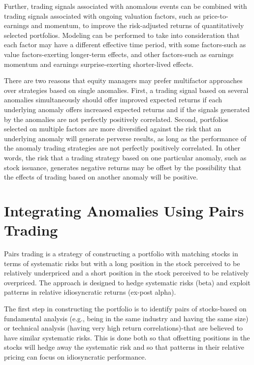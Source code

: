 \documentclass[11pt]{article}
\begin{document}
Further, trading signals associated with anomalous events can be combined with trading signals associated with ongoing valuation factors, such as price-to-earnings and momentum, to improve the risk-adjusted returns of quantitatively selected portfolios. Modeling can be performed to take into consideration that each factor may have a different effective time period, with some factors-such as value factors-exerting longer-term effects, and other factors-such as earnings momentum and earnings surprise-exerting shorter-lived effects.

There are two reasons that equity managers may prefer multifactor approaches over strategies based on single anomalies. First, a trading signal based on several anomalies simultaneously should offer improved expected returns if each underlying anomaly offers increased expected returns and if the signals generated by the anomalies are not perfectly positively correlated. Second, portfolios selected on multiple factors are more diversified against the risk that an underlying anomaly will generate perverse results, as long as the performance of the anomaly trading strategies are not perfectly positively correlated. In other words, the risk that a trading strategy based on one particular anomaly, such as stock issuance, generates negative returns may be offset by the possibility that the effects of trading based on another anomaly will be positive.

\section*{Integrating Anomalies Using Pairs Trading}
Pairs trading is a strategy of constructing a portfolio with matching stocks in terms of systematic risks but with a long position in the stock perceived to be relatively underpriced and a short position in the stock perceived to be relatively overpriced. The approach is designed to hedge systematic risks (beta) and exploit patterns in relative idiosyncratic returns (ex-post alpha).

The first step in constructing the portfolio is to identify pairs of stocks-based on fundamental analysis (e.g., being in the same industry and having the same size) or technical analysis (having very high return correlations)-that are believed to have similar systematic risks. This is done both so that offsetting positions in the stocks will hedge away the systematic risk and so that patterns in their relative pricing can focus on idiosyncratic performance.
\end{document}
